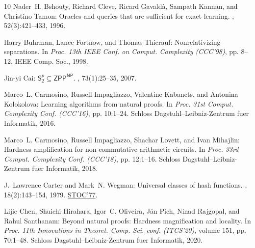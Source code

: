 \documentclass[11pt]{article}
\numberwithin{equation}{section}
\theoremstyle{definition}
\theoremstyle{plain}
\begin{document}
\begin{thebibliography}{10}
{\sc Nader~H. Bshouty, Richard Cleve, Ricard Gavald{\`{a}}, Sampath Kannan, and
  Christino Tamon}: Oracles and queries that are sufficient for exact learning.
, 52(3):421--433, 1996.

{\sc Harry Buhrman, Lance Fortnow, and Thomas Thierauf}: Nonrelativizing
  separations.
\newblock In {\em Proc. 13th IEEE Conf. on Comput. Complexity (CCC'98)}, pp.
  8--12. IEEE Comp. Soc., 1998.

{\sc Jin{-}yi Cai}: {$\mathsf{S}^p_2 \subseteq {\mathsf{ZPP}}^{\mathsf{NP}}$}.
, 73(1):25--35, 2007.

{\sc Marco~L. Carmosino, Russell Impagliazzo, Valentine Kabanets, and Antonina
  Kolokolova}: Learning algorithms from natural proofs.
\newblock In {\em Proc. 31st Comput. Complexity Conf. (CCC'16)}, pp. 10:1--24.
  Schloss Dagstuhl--Leibniz-Zentrum fuer Informatik, 2016.

{\sc Marco~L. Carmosino, Russell Impagliazzo, Shachar Lovett, and Ivan
  Mihajlin}: Hardness amplification for non-commutative arithmetic circuits.
\newblock In {\em Proc. 33rd Comput. Complexity Conf. (CCC'18)}, pp. 12:1--16.
  Schloss Dagstuhl--Leibniz-Zentrum fuer Informatik, 2018.

{\sc J.~Lawrence Carter and Mark~N. Wegman}: Universal classes of hash
  functions.
, 18(2):143--154, 1979.
\newblock \prelim \href{https://doi.org/10.1145/800105.803400}{STOC'77}.
\newblock [\epfmtdoi{10.1016/0022-0000(79)90044-8}]

{\sc Lijie Chen, Shuichi Hirahara, Igor~C. Oliveira, J{\'a}n Pich, Ninad
  Rajgopal, and Rahul Santhanam}: Beyond natural proofs: {H}ardness
  magnification and locality.
\newblock In {\em Proc. 11th Innovations in Theoret. Comp. Sci. conf.
  (ITCS'20)}, volume 151, pp. 70:1--48. Schloss Dagstuhl--Leibniz-Zentrum fuer
  Informatik, 2020.


\end{thebibliography}
\end{document}
